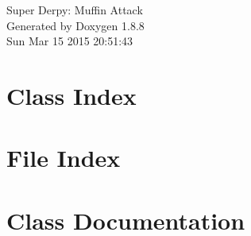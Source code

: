\documentclass[twoside]{book}
\newcommand{\+}{\discretionary{\mbox{\scriptsize$\hookleftarrow$}}{}{}}
\newcommand{\clearemptydoublepage}{%
  \newpage{\pagestyle{empty}\cleardoublepage}%
}
\begin{document}
\hypersetup{pageanchor=false,
             bookmarks=true,
             bookmarksnumbered=true,
             pdfencoding=unicode
            }
\begin{titlepage}
\vspace*{7cm}
\begin{center}%
{\Large Super Derpy\+: Muffin Attack }\\
\vspace*{1cm}
{\large Generated by Doxygen 1.8.8}\\
\vspace*{0.5cm}
{\small Sun Mar 15 2015 20:51:43}\\
\end{center}
\end{titlepage}
\clearemptydoublepage
\tableofcontents
\clearemptydoublepage
{}
\hypersetup{pageanchor=true}

\chapter{Class Index}

\chapter{File Index}

\chapter{Class Documentation}






















\end{document}
